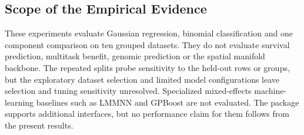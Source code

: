 \subsection{Scope of the Empirical Evidence}

These experiments evaluate Gaussian regression, binomial classification and one component comparison on ten grouped datasets. They do not evaluate survival prediction, multitask benefit, genomic prediction or the spatial manifold backbone. The repeated splits probe sensitivity to the held-out rows or groups, but the exploratory dataset selection and limited model configurations leave selection and tuning sensitivity unresolved. Specialized mixed-effects machine-learning baselines such as LMMNN and GPBoost are not evaluated. The package supports additional interfaces, but no performance claim for them follows from the present results.
